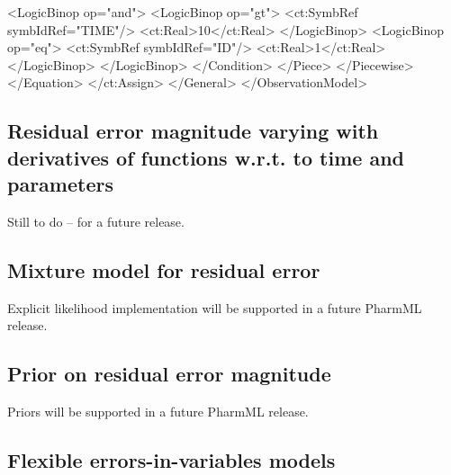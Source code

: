 \documentclass[a4paper,10pt]{article}
\begin{document}
\begin{xmlcode}
                            <LogicBinop op="and">
                                <LogicBinop op="gt">
                                    <ct:SymbRef symbIdRef="TIME"/>
                                    <ct:Real>10</ct:Real>
                                </LogicBinop>
                                <LogicBinop op="eq">
                                    <ct:SymbRef symbIdRef="ID"/>
                                    <ct:Real>1</ct:Real>
                                </LogicBinop>
                            </LogicBinop>
                        </Condition>
                    </Piece>
                </Piecewise>
            </Equation>
        </ct:Assign>
    </General>
</ObservationModel>
\end{xmlcode}


\subsection{Residual error magnitude varying with derivatives of functions w.r.t. to time and parameters}
\label{modelKK_RM6}

Still to do -- for a future release.



\subsection{Mixture model for residual error}
\label{modelKK_RM7}

Explicit likelihood implementation will be supported in a future PharmML release.



\subsection{Prior on residual error magnitude}
\label{modelKK_RM8}

Priors will be supported in a future PharmML release.


\subsection{Flexible errors-in-variables models}
\label{modelKK_RM9}
\end{document}
